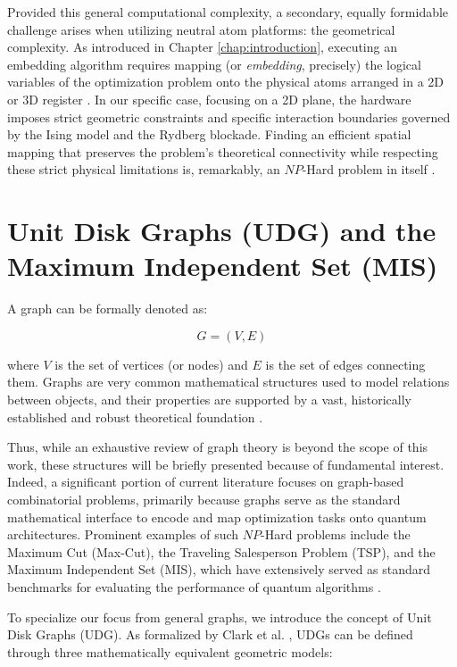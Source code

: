 Provided this general computational complexity, a secondary, equally formidable challenge arises when utilizing neutral atom platforms: the geometrical complexity. As introduced in Chapter \ref{chap:introduction}, executing an embedding algorithm requires mapping (or \textit{embedding}, precisely) the logical variables of the optimization problem onto the physical atoms arranged in a 2D or 3D register \cite{Henriet2020quantumcomputing}. 
In our specific case, focusing on a 2D plane, the hardware imposes strict geometric constraints and specific interaction boundaries governed by the Ising model and the Rydberg blockade. Finding an efficient spatial mapping that preserves the problem's theoretical connectivity while respecting these strict physical limitations is, remarkably, an $NP$-Hard problem in itself \cite{Vercellino_2022}.

\section{Unit Disk Graphs (UDG) and the Maximum Independent Set (MIS)}
\label{sec:UDG_and_MIS}

A graph can be formally denoted as:

\begin{equation}
    G = (V, E)
\end{equation}

where $V$ is the set of vertices (or nodes) and $E$ is the set of edges connecting them. Graphs are very common mathematical structures used to model relations between objects, and their properties are supported by a vast, historically established and robust theoretical foundation \cite{berge2001theory}. 

Thus, while an exhaustive review of graph theory is beyond the scope of this work, these structures will be briefly presented because of fundamental interest. Indeed, a significant portion of current literature focuses on graph-based combinatorial problems, primarily because graphs serve as the standard mathematical interface to encode and map optimization tasks onto quantum architectures. 
Prominent examples of such $NP$-Hard problems include the Maximum Cut (Max-Cut), the Traveling Salesperson Problem (TSP), and the Maximum Independent Set (MIS), which have extensively served as standard benchmarks for evaluating the performance of quantum algorithms \cite{lucas2014ising}.

To specialize our focus from general graphs, we introduce the concept of Unit Disk Graphs (UDG). As formalized by Clark et al. \cite{CLARK1990165}, UDGs can be defined through three mathematically equivalent geometric models:

